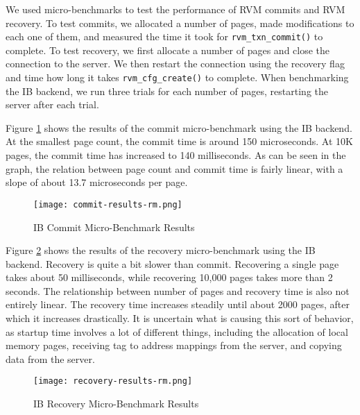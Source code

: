 We used micro-benchmarks to test the performance of RVM commits and RVM
recovery. To test commits, we allocated a number of pages, made modifications
to each one of them, and measured the time it took for \verb|rvm_txn_commit()|
to complete. To test recovery, we first allocate a number of pages and
close the connection to the server. We then restart the connection using the
recovery flag and time how long it takes \verb|rvm_cfg_create()| to complete.
When benchmarking the IB backend, we run three trials for each number of pages,
restarting the server after each trial.

Figure \ref{fig:ib-commit-ubm} shows the results of the commit micro-benchmark
using the IB backend. At the smallest page count, the commit time is around
150 microseconds. At 10K pages, the commit time has increased to 140 milliseconds.
As can be seen in the graph, the relation between page count and commit time
is fairly linear, with a slope of about 13.7 microseconds per page.

\begin{figure}[h]
    \caption{IB Commit Micro-Benchmark Results}
    \texttt{[image: commit-results-rm.png]}
    \label{fig:ib-commit-ubm}
\end{figure}

Figure \ref{fig:ib-recovery-ubm} shows the results of the recovery
micro-benchmark using the IB backend. Recovery is quite a bit slower than
commit. Recovering a single page takes about 50 milliseconds, while recovering
10,000 pages takes more than 2 seconds. The relationship between number of
pages and recovery time is also not entirely linear.
The recovery time increases steadily until about 2000 pages, after which it
increases drastically. It is uncertain what is causing this sort of behavior,
as startup time involves a lot of different things, including the allocation
of local memory pages, receiving tag to address mappings from the server, and
copying data from the server.

\begin{figure}[h]
    \caption{IB Recovery Micro-Benchmark Results}
    \texttt{[image: recovery-results-rm.png]}
    \label{fig:ib-recovery-ubm}
\end{figure}
